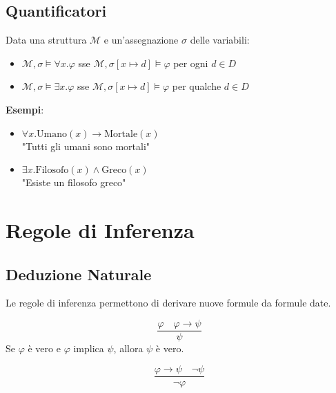 \subsection{Quantificatori}

\begin{definizione}
Data una struttura $\mathcal{M}$ e un'assegnazione $\sigma$ delle variabili:
\begin{itemize}
\item $\mathcal{M}, \sigma \models \forall x. \varphi$ sse $\mathcal{M}, \sigma[x \mapsto d] \models \varphi$ per ogni $d \in D$
\item $\mathcal{M}, \sigma \models \exists x. \varphi$ sse $\mathcal{M}, \sigma[x \mapsto d] \models \varphi$ per qualche $d \in D$
\end{itemize}
\end{definizione}

\textbf{Esempi}:
\begin{itemize}
\item $\forall x. \text{Umano}(x) \rightarrow \text{Mortale}(x)$ \\
  "Tutti gli umani sono mortali"
\item $\exists x. \text{Filosofo}(x) \land \text{Greco}(x)$ \\
  "Esiste un filosofo greco"
\end{itemize}

\section{Regole di Inferenza}

\subsection{Deduzione Naturale}

Le regole di inferenza permettono di derivare nuove formule da formule date.

\begin{teorema}
\begin{equation}
\frac{\varphi \quad \varphi \rightarrow \psi}{\psi}
\end{equation}
Se $\varphi$ è vero e $\varphi$ implica $\psi$, allora $\psi$ è vero.
\end{teorema}

\begin{teorema}
\begin{equation}
\frac{\varphi \rightarrow \psi \quad \neg \psi}{\neg \varphi}
\end{equation}
\end{teorema}

